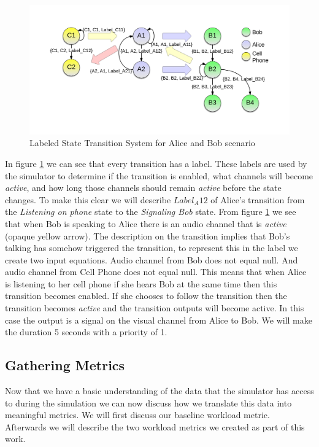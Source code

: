 \begin{figure}[h]
\begin{center}
\includegraphics[width=\textwidth]{ab_lsts.png}
\caption{Labeled State Transition System for Alice and Bob scenario}
\label{fig:ab_lsts}
\end{center}
\end{figure}

In figure \ref{fig:ab_lsts} we can see that every transition has a label.  These labels are used by the simulator to determine if the transition is enabled, what channels will become {\em active}, and how long those channels should remain {\em active} before the state changes.  To make this clear we will describe $Label_A12$ of Alice's transition from the {\em Listening on phone} state to the {\em Signaling Bob} state.  From figure \ref{fig:ab_lsts} we see that when Bob is speaking to Alice there is an audio channel that is {\em active} (opaque yellow arrow).  The description on the transition implies that Bob's talking has somehow triggered the transition, to represent this in the label we create two input equations.  Audio channel from Bob does not equal null.  And audio channel from Cell Phone does not equal null.  This means that when Alice is listening to her cell phone if she hears Bob at the same time then this transition becomes enabled.  If she chooses to follow the transition then the transition becomes {\em active} and the transition outputs will become active.  In this case the output is a signal on the visual channel from Alice to Bob.  We will make the duration 5 seconds with a priority of 1.  

\subsection{Gathering Metrics}
Now that we have a basic understanding of the data that the simulator has access to during the simulation we can now discuss how we translate this data into meaningful metrics.  We will first discuss our baseline workload metric.  Afterwards we will describe the two workload metrics we created as part of this work.


